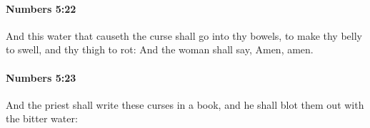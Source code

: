 		\paragraph{Numbers 5:22} %
			\label{NUMBERS-5-22}

			And this water that causeth the curse shall go into thy bowels, to make thy belly to swell, and thy thigh to rot: And the woman shall say, Amen, amen.


		\paragraph{Numbers 5:23} %
			\label{NUMBERS-5-23}

			And the priest shall write these curses in a book, and he shall blot them out with the bitter water:


